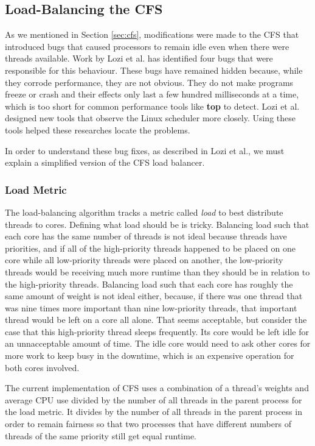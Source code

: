 \documentclass{sig-alternate}
\begin{document}
\subsection{Load-Balancing the CFS}
\label{sec:loadbalance}

As we mentioned in Section \ref{sec:cfs}, modifications were made to the CFS that introduced bugs that caused processors to remain idle even when there were threads available. Work by Lozi et al. has identified four bugs that were responsible for this behaviour. These bugs have remained hidden because, while they corrode performance, they are not obvious. They do not make programs freeze or crash and their effects only last a few hundred milliseconds at a time, which is too short for common performance tools like \textbf{top} to detect. Lozi et al. designed new tools that observe the Linux scheduler more closely. Using these tools helped these researches locate the problems.~\cite{Lozi:2016}

In order to understand these bug fixes, as described in Lozi et al., we must explain a simplified version of the CFS load balancer.~\cite{Lozi:2016}

\subsubsection{Load Metric}
\label{sec:loadmetric}

The load-balancing algorithm tracks a metric called \emph{load} to best distribute threads to cores. Defining what load should be is tricky. Balancing load such that each core has the same number of threads is not ideal because threads have priorities, and if all of the high-priority threads happened to be placed on one core while all low-priority threads were placed on another, the low-priority threads would be receiving much more runtime than they should be in relation to the high-priority threads. Balancing load such that each core has roughly the same amount of weight is not ideal either, because, if there was one thread that was nine times more important than nine low-priority threads, that important thread would be left on a core all alone. That seems acceptable, but consider the case that this high-priority thread sleeps frequently. Its core would be left idle for an unnacceptable amount of time. The idle core would need to ask other cores for more work to keep busy in the downtime, which is an expensive operation for both cores involved.~\cite{Lozi:2016}

The current implementation of CFS uses a combination of a thread's weights and average CPU use divided by the number of all threads in the parent process for the load metric. It divides by the number of all threads in the parent process in order to remain fairness so that two processes that have different numbers of threads of the same priority still get equal runtime.~\cite{Lozi:2016}
\end{document}
